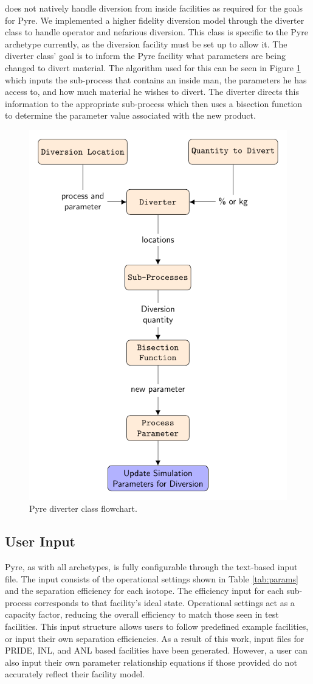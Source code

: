 \Cyclus does not natively handle diversion from inside facilities as required for the goals for Pyre. We implemented a higher fidelity diversion model through the
diverter class to handle operator and nefarious diversion. This class is specific to the Pyre archetype currently, as the diversion facility must be set up to allow it.
The diverter class' goal is to inform the Pyre facility what parameters are being changed to divert material. The algorithm used for this can be seen in Figure \ref{fig:divflow}
which inputs the sub-process that contains an inside man, the parameters he has access to, and how much material he wishes to divert. The diverter directs this information to the
appropriate sub-process which then uses a bisection function to determine the parameter value associated with the new product.

\FloatBarrier

\begin{figure}[h]
	\centering
	\includegraphics[width=0.65\linewidth]{images/divertflow}
	\caption{Pyre diverter class flowchart.}
	\label{fig:divflow}
\end{figure}

\subsection{User Input}
Pyre, as with all \Cyclus archetypes, is fully configurable through the text-based input file. The input consists of the operational settings shown in Table \ref{tab:params}
and the separation efficiency for each isotope. The efficiency input for each sub-process corresponds to that facility's ideal state. Operational settings act as a capacity factor,
reducing the overall efficiency to match those seen in test facilities. This input structure allows users to follow predefined example facilities, or input their own separation
efficiencies. As a result of this work, input files for PRIDE, INL, and ANL based facilities have been generated. However, a user can also input their own parameter relationship equations
if those provided do not accurately reflect their facility model.